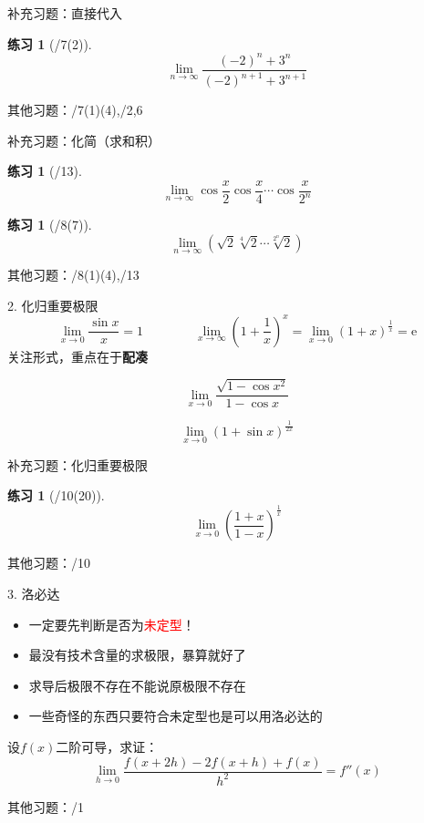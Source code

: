 \documentclass[UTF8]{ctexbeamer}
\newtheorem{exercise}[theorem]{练习} %
\begin{document}
\begin{frame}{补充习题：直接代入}
\begin{exercise}[/7(2)]
\[\lim_{n\to\infty}\frac{(-2)^n+3^n}{(-2)^{n+1}+3^{n+1}}\]
\end{exercise}
其他习题：/7(1)(4),/2,6
\end{frame}

\begin{frame}{补充习题：化简（求和积）}
\begin{exercise}[/13]
\[\lim_{n\to\infty}\cos\frac{x}{2}\cos\frac{x}{4}\cdots\cos\frac{x}{2^n}\]
\end{exercise}
\begin{exercise}[/8(7)]
\[\lim_{n\to\infty}(\sqrt{2}\sqrt[4]{2}\cdots\sqrt[2^n]{2})\]
\end{exercise}
其他习题：/8(1)(4),/13
\end{frame}

\begin{frame}{2. 化归重要极限}
\[\displaystyle\lim_{x\to 0}\frac{\sin x}{x}=1\qquad\qquad\lim_{x\to\infty}\left(1+\frac{1}{x}\right)^x=\lim_{x\to 0}(1+x)^{\frac{1}{x}}=\mathrm{e}\]
关注形式，重点在于\textbf{配凑}
\begin{example}[\textsection 3.3/10(9)]
\[\lim_{x\to 0}\frac{\sqrt{1-\cos x^2}}{1-\cos x}\]
\end{example}
\begin{example}[17数分期中]
\[\lim_{x\to 0}(1+\sin x)^{\frac{1}{2x}}\]
\end{example}
\end{frame}

\begin{frame}{补充习题：化归重要极限}
\begin{exercise}[/10(20)]
\[\lim_{x\to 0}\left(\frac{1+x}{1-x}\right)^{\frac{1}{x}}\]
\end{exercise}
其他习题：/10
\end{frame}

\begin{frame}{3. 洛必达}
\begin{itemize}
	\item 一定要先判断是否为\textcolor{red}{\Large 未定型}！
	\item 最没有技术含量的求极限，暴算就好了
	\item 求导后极限不存在不能说原极限不存在
	\item 一些奇怪的东西只要符合未定型也是可以用洛必达的
\end{itemize}
\begin{example}[\textsection 5.2/3]
设$f(x)$二阶可导，求证：
\[\lim_{h\to 0}\frac{f(x+2h)-2f(x+h)+f(x)}{h^2}=f''(x)\]
\end{example}
其他习题：/1
\end{frame}
\end{document}
